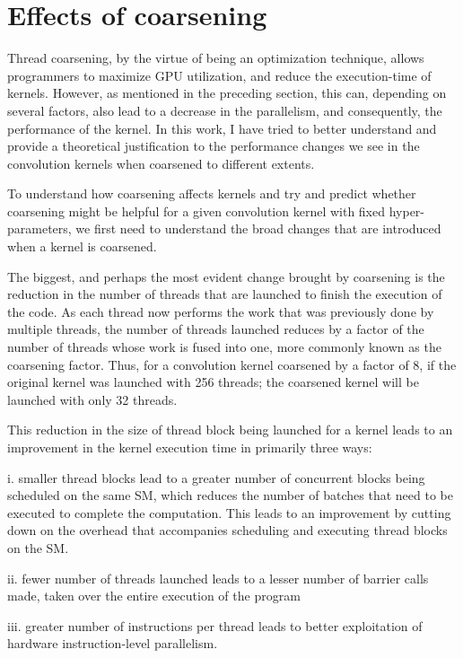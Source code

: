 \section{Effects of coarsening} \label{sec:effect_of_coarsening}

Thread coarsening, by the virtue of being an optimization technique, allows programmers to maximize GPU utilization, and reduce the execution-time of kernels. However, as mentioned in the preceding section, this can, depending on several factors, also lead to a decrease in the parallelism, and consequently, the performance of the kernel. In this work, I have tried to better understand and provide a theoretical justification to the performance changes we see in the convolution kernels when coarsened to different extents.

To understand how coarsening affects kernels and try and predict whether coarsening might be helpful for a given convolution kernel with fixed hyper-parameters, we first need to understand the broad changes that are introduced when a kernel is coarsened.

The biggest, and perhaps the most evident change brought by coarsening is the reduction in the number of threads that are launched to finish the execution of the code. As each thread now performs the work that was previously done by multiple threads, the number of threads launched reduces by a factor of the number of threads whose work is fused into one, more commonly known as the coarsening factor. Thus, for a convolution kernel coarsened by a factor of 8, if the original kernel was launched with 256 threads; the coarsened kernel will be launched with only 32 threads.

This reduction in the size of thread block being launched for a kernel leads to an improvement in the kernel execution time in primarily three ways:

i. smaller thread blocks lead to a greater number of concurrent blocks being scheduled on the same SM, which reduces the number of batches that need to be executed to complete the computation. This leads to an improvement by cutting down on the overhead that accompanies scheduling and executing thread blocks on the SM.

ii. fewer number of threads launched leads to a lesser number of barrier calls made, taken over the entire execution of the program

iii. greater number of instructions per thread leads to better exploitation of hardware instruction-level parallelism.

